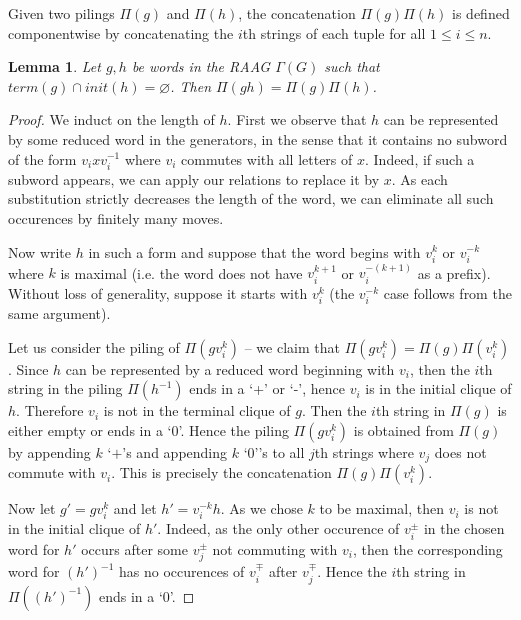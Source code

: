 \documentclass[12pt]{article}
\newtheorem{lem}{Lemma}
\begin{document}
	  Given two pilings $ \Pi(g) $ and $ \Pi(h) $, the concatenation $ \Pi(g)\Pi(h) $ is defined componentwise by concatenating the $ i $th strings of each tuple for all $ 1 \leq i \leq n $.
\begin{lem} 
	Let $ g,h$ be words in the RAAG $ \Gamma(G) $ such that $ term(g) \cap init(h) = \varnothing $. Then $ \Pi(gh) = \Pi(g)\Pi(h) $. 
	  \end{lem}
	  \begin{proof}
		  We induct on the length of $ h $. First we observe that $ h $ can be represented by some reduced word in the generators, in the sense that it contains no subword of the form $ v _{i} x v _{i} ^{-1} $ where $ v _{i} $ commutes with all letters of $ x $. Indeed, if such a subword appears, we can apply our relations to replace it by $ x $. As each substitution strictly decreases the length of the word, we can eliminate all such occurences by finitely many moves.

		  Now write $ h $ in such a form and suppose that the word begins with $ v _{i} ^{k} $ or $ v _{i} ^{-k} $ where $ k $ is maximal (i.e. the word does not have $ v _{i} ^{k+1} $ or $ v _{i} ^{-(k+1)} $ as a prefix). Without loss of generality, suppose it starts with $ v _{i} ^{k} $ (the $ v _{i} ^{-k} $ case follows from the same argument).

		  Let us consider the piling of $ \Pi(gv _{i} ^{k}) $ -- we claim that $ \Pi(g v _{i} ^{k}) = \Pi(g)\Pi(v _{i} ^{k}) $. Since $ h $ can be represented by a reduced word beginning with $ v _{i} $, then the $ i $th string in the piling $ \Pi(h ^{-1}) $ ends in a `+' or `-', hence $ v _{i} $ is in the initial clique of $ h $. Therefore $ v _{i} $ is not in the terminal clique of $ g $. Then the $ i $th string in $ \Pi(g) $ is either empty or ends in a `$ 0 $'. Hence the piling $ \Pi(gv _{i} ^{k}) $ is obtained from $ \Pi(g) $ by appending $ k $ `$ + $'s and appending $ k $ `$ 0 $''s to all $ j $th strings where $ v _{j} $ does not commute with $ v _{i} $. This is precisely the concatenation $ \Pi(g)\Pi(v _{i} ^{k}) $.

		  Now let $ g' = gv _{i} ^{k} $ and let $ h' = v _{i} ^{-k} h $. As we chose $ k $ to be maximal, then $ v _{i} $ is not in the initial clique of $ h' $. Indeed, as the only other occurence of $ v _{i} ^{\pm} $ in the chosen word for $ h' $ occurs after some $ v _{j} ^{\pm}  $ not commuting with $ v _{i} $, then the corresponding word for $ (h') ^{-1} $ has no occurences of $ v _{i} ^{\mp} $ after $ v _{j} ^{\mp} $. Hence the $ i $th string in $ \Pi((h') ^{-1}) $ ends in a `0'.


\end{proof}
\end{document}
